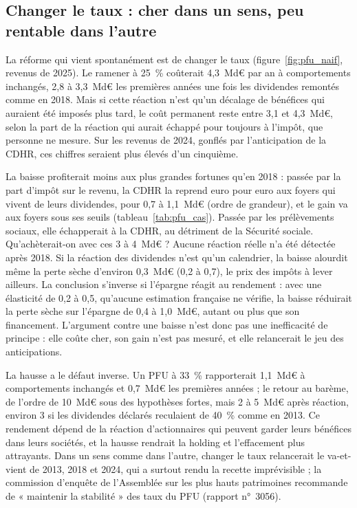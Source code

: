 \subsection{Changer le taux : cher dans un sens, peu rentable dans l'autre}\label{sec:pfu_naif}

La réforme qui vient spontanément est de changer le taux (figure~\ref{fig:pfu_naif}, revenus de 2025). Le ramener à
25~\% coûterait 4,3~Md€ par an à comportements inchangés, 2,8 à 3,3~Md€ les premières années une fois les dividendes
remontés comme en 2018. Mais si cette réaction n'est qu'un décalage de bénéfices qui auraient été imposés plus tard,
le coût permanent reste entre 3,1 et 4,3~Md€, selon la part de la réaction qui aurait échappé pour toujours à
l'impôt, que personne ne mesure. Sur les revenus de 2024, gonflés par l'anticipation de la CDHR, ces chiffres
seraient plus élevés d'un cinquième.


La baisse profiterait moins aux plus grandes fortunes qu'en 2018 : passée par la part d'impôt sur le revenu, la CDHR
la reprend euro pour euro aux foyers qui vivent de leurs dividendes, pour 0,7 à 1,1~Md€ (ordre de grandeur), et le
gain va aux foyers sous ses seuils (tableau~\ref{tab:pfu_cas}). Passée par les prélèvements sociaux, elle échapperait
à la CDHR, au détriment de la Sécurité sociale. Qu'achèterait-on avec ces 3 à 4~Md€ ? Aucune réaction réelle n'a été
détectée après 2018. Si la réaction des dividendes n'est qu'un calendrier, la baisse alourdit même la perte sèche
d'environ 0,3~Md€ (0,2 à 0,7), le prix des impôts à lever ailleurs. La conclusion s'inverse si l'épargne réagit au
rendement : avec une élasticité de 0,2 à 0,5, qu'aucune estimation française ne vérifie, la baisse réduirait la
perte sèche sur l'épargne de 0,4 à 1,0~Md€, autant ou plus que son financement. L'argument contre une baisse n'est
donc pas une inefficacité de principe : elle coûte cher, son gain n'est pas mesuré, et elle relancerait le jeu des
anticipations.

La hausse a le défaut inverse. Un PFU à 33~\% rapporterait 1,1~Md€ à comportements inchangés et 0,7~Md€ les
premières années ; le retour au barème, de l'ordre de 10~Md€ sous des hypothèses fortes, mais 2 à 5~Md€ après
réaction, environ 3 si les dividendes déclarés reculaient de 40~\% comme en 2013. Ce rendement dépend de la réaction
d'actionnaires qui peuvent garder leurs bénéfices dans leurs sociétés, et la hausse rendrait la holding et
l'effacement plus attrayants. Dans un sens comme dans l'autre, changer le taux relancerait le va-et-vient de 2013,
2018 et 2024, qui a surtout rendu la recette imprévisible ; la commission d'enquête de l'Assemblée sur les plus
hauts patrimoines recommande de « maintenir la stabilité » des taux du PFU (rapport n°~3056).


